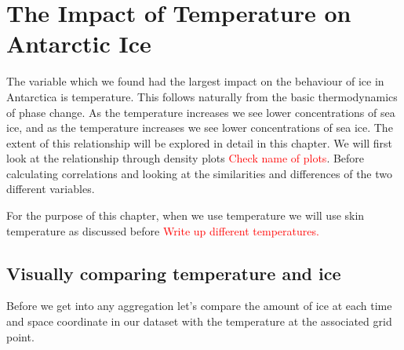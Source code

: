 \documentclass[../main.tex]{subfiles}
\begin{document}
\chapter[Temperature and Ice]{The Impact of Temperature on Antarctic Ice}

The variable which we found had the largest impact on the behaviour of ice in Antarctica is temperature. This follows naturally from the basic thermodynamics of phase change. As the temperature increases we see lower concentrations of sea ice, and as the temperature increases we see lower concentrations of sea ice. The extent of this relationship will be explored in detail in this chapter. We will first look at the relationship through density plots \textcolor{red}{Check name of plots}. Before calculating correlations and looking at the similarities and differences of the two different variables.

For the purpose of this chapter, when we use temperature we will use skin temperature as discussed before \textcolor{red}{Write up different temperatures.}


\section{Visually comparing temperature and ice}
Before we get into any aggregation let's compare the amount of ice at each time and space coordinate in our dataset with the temperature at the associated grid point. 
\end{document}
